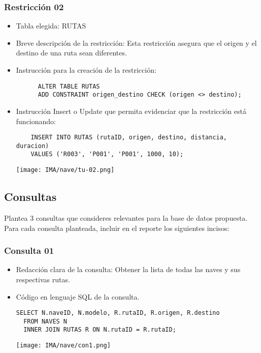 \subsubsection*{Restricción 02}

\begin{itemize} 
  \item Tabla elegida: RUTAS 
  \item Breve descripción de la restricción: Esta restricción asegura que el origen y el destino de una ruta sean diferentes. 
  \item Instrucción para la creación de la restricción: 
    \begin{verbatim} 
      ALTER TABLE RUTAS 
      ADD CONSTRAINT origen_destino CHECK (origen <> destino); 
    \end{verbatim} 
  \item Instrucción Insert o Update que permita evidenciar que la restricción está funcionando: 
    \begin{verbatim}
    INSERT INTO RUTAS (rutaID, origen, destino, distancia, duracion) 
    VALUES ('R003', 'P001', 'P001', 1000, 10);
    \end{verbatim}
    \begin{center}
      \texttt{[image: IMA/nave/tu-02.png]}
    \end{center}
\end{itemize}

\subsection{Consultas}

Plantea 3 consultas que consideres relevantes para la base de datos propuesta. Para cada consulta planteada, incluir en el reporte los siguientes incisos:


\subsubsection*{Consulta 01}

\begin{itemize} 
  \item Redacción clara de la consulta: Obtener la lista de todas las naves y sus respectivas rutas. 
  \item Código en lenguaje SQL de la consulta.

  \begin{lstlisting}[caption={Consulta de naves y rutas}, label={lst:sql_estadios}]
  SELECT N.naveID, N.modelo, R.rutaID, R.origen, R.destino
  FROM NAVES N
  INNER JOIN RUTAS R ON N.rutaID = R.rutaID;
  \end{lstlisting}    

    \begin{center}
      \texttt{[image: IMA/nave/con1.png]}
    \end{center}
    
\end{itemize}


